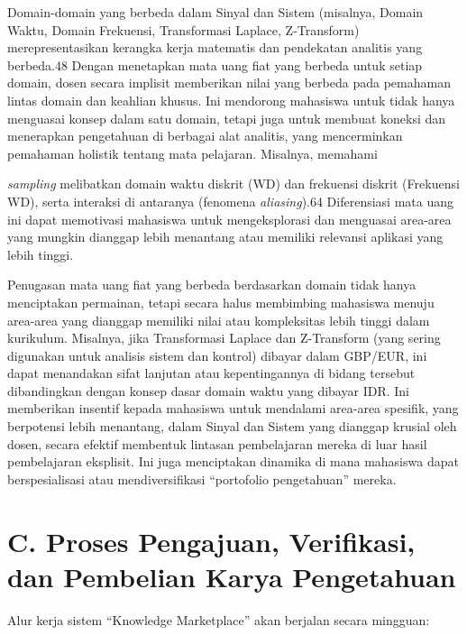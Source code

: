 \documentclass[
  letterpaper,
  DIV=11,
  numbers=noendperiod]{scrreprt}
\begin{document}
Domain-domain yang berbeda dalam Sinyal dan Sistem (misalnya, Domain
Waktu, Domain Frekuensi, Transformasi Laplace, Z-Transform)
merepresentasikan kerangka kerja matematis dan pendekatan analitis yang
berbeda.48 Dengan menetapkan mata uang fiat yang berbeda untuk setiap
domain, dosen secara implisit memberikan nilai yang berbeda pada
pemahaman lintas domain dan keahlian khusus. Ini mendorong mahasiswa
untuk tidak hanya menguasai konsep dalam satu domain, tetapi juga untuk
membuat koneksi dan menerapkan pengetahuan di berbagai alat analitis,
yang mencerminkan pemahaman holistik tentang mata pelajaran. Misalnya,
memahami

\emph{sampling} melibatkan domain waktu diskrit (WD) dan frekuensi
diskrit (Frekuensi WD), serta interaksi di antaranya (fenomena
\emph{aliasing}).64 Diferensiasi mata uang ini dapat memotivasi
mahasiswa untuk mengeksplorasi dan menguasai area-area yang mungkin
dianggap lebih menantang atau memiliki relevansi aplikasi yang lebih
tinggi.

Penugasan mata uang fiat yang berbeda berdasarkan domain tidak hanya
menciptakan permainan, tetapi secara halus membimbing mahasiswa menuju
area-area yang dianggap memiliki nilai atau kompleksitas lebih tinggi
dalam kurikulum. Misalnya, jika Transformasi Laplace dan Z-Transform
(yang sering digunakan untuk analisis sistem dan kontrol) dibayar dalam
GBP/EUR, ini dapat menandakan sifat lanjutan atau kepentingannya di
bidang tersebut dibandingkan dengan konsep dasar domain waktu yang
dibayar IDR. Ini memberikan insentif kepada mahasiswa untuk mendalami
area-area spesifik, yang berpotensi lebih menantang, dalam Sinyal dan
Sistem yang dianggap krusial oleh dosen, secara efektif membentuk
lintasan pembelajaran mereka di luar hasil pembelajaran eksplisit. Ini
juga menciptakan dinamika di mana mahasiswa dapat berspesialisasi atau
mendiversifikasi ``portofolio pengetahuan'' mereka.

\section{C. Proses Pengajuan, Verifikasi, dan Pembelian Karya
Pengetahuan}\label{c.-proses-pengajuan-verifikasi-dan-pembelian-karya-pengetahuan}

Alur kerja sistem ``Knowledge Marketplace'' akan berjalan secara
mingguan:
\end{document}
